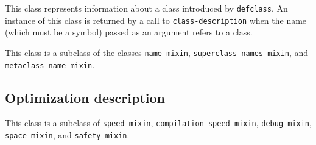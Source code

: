 
This class represents information about a class introduced by
\texttt{defclass}.  An instance of this class is returned by a call to
\texttt{class-description} when the name (which must be a symbol)
passed as an argument refers to a class.

This class is a subclass of the classes \texttt{name-mixin},
\texttt{superclass-names-mixin},  and
\texttt{metaclass-name-mixin}.

\subsection{Optimization description}


This class is a subclass of \texttt{speed-mixin},
\texttt{compilation-speed-mixin}, \texttt{debug-mixin},
\texttt{space-mixin}, and \texttt{safety-mixin}.
